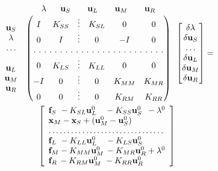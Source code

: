 \documentclass[11pt]{article}
\newcommand{\vecx}{{\bf x}}
\newcommand{\vecu}{{\bf u}}
\newcommand{\vecf}{{\bf f}}
\begin{document}
\begin{multline}
\label{eq:J_reordering}
\begin{array}{lc}  &  \begin{array}{ccccc} \lambda \ \  & \vecu_S \quad & \vecu_L \quad & \vecu_M & \quad \vecu_R \end{array}\\
\begin{matrix} \vecu_S  \\ \lambda \\ \dots\\ \\\vecu_L \\ \vecu_M \\ \vecu_R\end{matrix} &
\begin{pmatrix}
  I & K_{SS} &\vdots & K_{SL} &  0 & 0\\
  0 & I     &\vdots &   0     & -I& 0\\
  \hdotsfor[2]{6}\\
  0 & K_{LS} &\vdots &   K_{LL}&  0 & 0\\
  -I & 0    &\vdots &    0   & K_{MM}& K_{MR}\\
  0 & 0     &\vdots &    0   & K_{RM} & K_{RR}
\end{pmatrix}
\end{array}
\begin{bmatrix}
\delta \lambda\\ \delta \vecu_S \\ \dots \\ \delta \vecu_L \\ \delta \vecu_M \\ \delta \vecu_R
\end{bmatrix}
=\\
\left[\begin{array}{l}
\vecf_S \ - K_{SL} \vecu_L^0 \ \ \ - K_{SS} \vecu_S^0 \ \,- \lambda^0\\
\vecx_M - \vecx_S + (\vecu_M^0 - \vecu_S^0)\\
\dots\dots\dots\dots\dots\dots\dots\dots\dots\dots.\\
\vecf_L \ - K_{LL} \vecu_L^0 \ \ \ - K_{LS} \vecu_S^0 \\
\vecf_M - K_{MM} \vecu_M^0 \, - K_{MR} \vecu_R^0  + \lambda^0\\
\vecf_R \, - K_{RM} \vecu_M^0 \ - K_{RR} \vecu_R^0 \\
\end{array}\right]
\end{multline}
\end{document}
